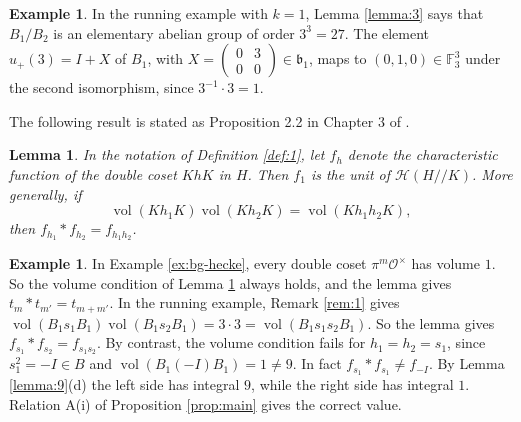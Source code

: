 \documentclass[12pt,letterpaper,reqno]{amsart}
\let\cal\mathcal
\let\Bbb\mathbb
\let\frak\mathfrak
\newtheorem{lemma}[theorem]{Lemma}
\theoremstyle{definition}
\newtheorem{example}[theorem]{Example}
\theoremstyle{remark}
\numberwithin{equation}{section}
\begin{document}
\begin{example}
\label{ex:lemma3}
In the running example with $k=1$, Lemma \ref{lemma:3} says that $B_1/B_2$ is
an elementary abelian group of order $3^3=27$. The element
$u_+(3)=I+X$ of $B_1$, with $X=\left(\begin{smallmatrix}0&3\\0&0
\end{smallmatrix}\right)\in{\frak b}_1$, maps to $(0,1,0)\in{\Bbb F}_3^3$
under the second isomorphism, since $3^{-1}\cdot 3=1$.
\end{example}

The following result is stated as Proposition 2.2 in Chapter 3 of \cite{HM85}.

\begin{lemma}
\label{lemma:general}
In the notation of Definition \ref{def:1}, let $f_h$ denote the characteristic
function of the double coset $K h K$ in $H$. Then $f_1$ is the unit of
${\cal H}(H//K)$. More generally, if
\[
\operatorname{vol}(Kh_1K)\operatorname{vol}(Kh_2K)=\operatorname{vol}(Kh_1h_2K),
\]
then $f_{h_1}*f_{h_2}=f_{h_1h_2}$.
\end{lemma}

\begin{example}
\label{ex:general}
In Example \ref{ex:bg-hecke}, every double coset $\pi^m{\cal O}^\times$ has
volume $1$. So the volume condition of Lemma \ref{lemma:general} always holds,
and the lemma gives $t_m*t_{m'}=t_{m+m'}$. In the running example, Remark
\ref{rem:1} gives $\operatorname{vol}(B_1s_1B_1)\operatorname{vol}(B_1s_2B_1)
=3\cdot3=\operatorname{vol}(B_1s_1s_2B_1)$. So the lemma gives
$f_{s_1}*f_{s_2}=f_{s_1s_2}$. By contrast, the volume condition fails for
$h_1=h_2=s_1$, since $s_1^2=-I\in B$ and $\operatorname{vol}(B_1(-I)B_1)=1\neq
9$. In fact $f_{s_1}*f_{s_1}\neq f_{-I}$. By Lemma \ref{lemma:9}(d) the left
side has integral $9$, while the right side has integral $1$. Relation A(i) of
Proposition \ref{prop:main} gives the correct value.
\end{example}
\end{document}
